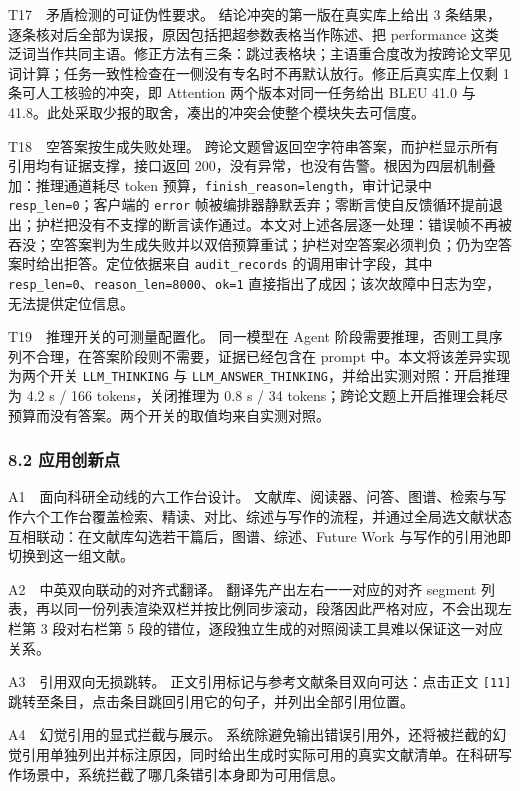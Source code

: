 \documentclass[UTF8,fontset=windows,zihao=5,a4paper]{ctexart}
\begin{document}
T17　矛盾检测的可证伪性要求。 结论冲突的第一版在真实库上给出 3 条结果，逐条核对后全部为误报，原因包括把超参数表格当作陈述、把 performance 这类泛词当作共同主语。修正方法有三条：跳过表格块；主语重合度改为按跨论文罕见词计算；任务一致性检查在一侧没有专名时不再默认放行。修正后真实库上仅剩 1 条可人工核验的冲突，即 Attention 两个版本对同一任务给出 BLEU 41.0 与 41.8。此处采取少报的取舍，凑出的冲突会使整个模块失去可信度。

T18　空答案按生成失败处理。 跨论文题曾返回空字符串答案，而护栏显示所有引用均有证据支撑，接口返回 200，没有异常，也没有告警。根因为四层机制叠加：推理通道耗尽 token 预算，\texttt{finish\_\allowbreak{}reason=length}，审计记录中 \texttt{resp\_\allowbreak{}len=0}；客户端的 \texttt{error} 帧被编排器静默丢弃；零断言使自反馈循环提前退出；护栏把没有不支撑的断言读作通过。本文对上述各层逐一处理：错误帧不再被吞没；空答案判为生成失败并以双倍预算重试；护栏对空答案必须判负；仍为空答案时给出拒答。定位依据来自 \texttt{audit\_\allowbreak{}records} 的调用审计字段，其中 \texttt{resp\_\allowbreak{}len=0}、\texttt{reason\_\allowbreak{}len=8000}、\texttt{ok=1} 直接指出了成因；该次故障中日志为空，无法提供定位信息。

T19　推理开关的可测量配置化。 同一模型在 Agent 阶段需要推理，否则工具序列不合理，在答案阶段则不需要，证据已经包含在 prompt 中。本文将该差异实现为两个开关 \texttt{LLM\_\allowbreak{}THINKING} 与 \texttt{LLM\_\allowbreak{}ANSWER\_\allowbreak{}THINKING}，并给出实测对照：开启推理为 4.2 s / 166 tokens，关闭推理为 0.8 s / 34 tokens；跨论文题上开启推理会耗尽预算而没有答案。两个开关的取值均来自实测对照。

\subsubsection*{8.2 应用创新点}
A1　面向科研全动线的六工作台设计。 文献库、阅读器、问答、图谱、检索与写作六个工作台覆盖检索、精读、对比、综述与写作的流程，并通过全局选文献状态互相联动：在文献库勾选若干篇后，图谱、综述、Future Work 与写作的引用池即切换到这一组文献。

A2　中英双向联动的对齐式翻译。 翻译先产出左右一一对应的对齐 segment 列表，再以同一份列表渲染双栏并按比例同步滚动，段落因此严格对应，不会出现左栏第 3 段对右栏第 5 段的错位，逐段独立生成的对照阅读工具难以保证这一对应关系。

A3　引用双向无损跳转。 正文引用标记与参考文献条目双向可达：点击正文 \texttt{[11]} 跳转至条目，点击条目跳回引用它的句子，并列出全部引用位置。

A4　幻觉引用的显式拦截与展示。 系统除避免输出错误引用外，还将被拦截的幻觉引用单独列出并标注原因，同时给出生成时实际可用的真实文献清单。在科研写作场景中，系统拦截了哪几条错引本身即为可用信息。
\end{document}
